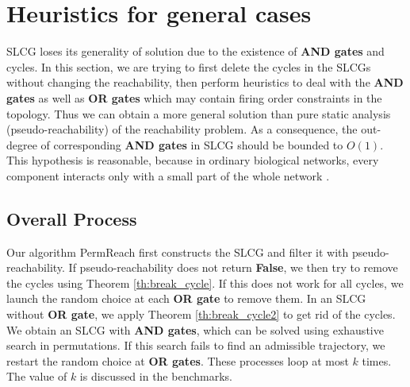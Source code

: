 \documentclass[runningheads]{llncs}
\begin{document}
\section{Heuristics for general cases}\label{sect:4}
SLCG loses its generality of solution due to the existence of \textbf{AND gates} and cycles.
In this section, we are trying to first delete the cycles in the SLCGs without changing the reachability, then perform heuristics to deal with the \textbf{AND gates} as well as \textbf{OR gates} which may contain firing order constraints in the topology.
Thus we can obtain a more general solution than pure static analysis (pseudo-reachability) of the reachability problem.
As a consequence, the out-degree of corresponding \textbf{AND gates} in SLCG should be bounded to $O(1)$.
This hypothesis is reasonable, because in ordinary biological networks, every component interacts only with a small part of the whole network \cite{akutsu2007control}.

\subsection{Overall Process}\label{sectOverall}
Our algorithm PermReach first constructs the SLCG and filter it with pseudo-reachability. 
If pseudo-reachability does not return \textbf{False}, we then try to remove the cycles using Theorem \ref{th:break_cycle}.
If this does not work for all cycles, we launch the random choice at each \textbf{OR gate} to remove them.
In an SLCG without \textbf{OR gate}, we apply Theorem \ref{th:break_cycle2} to get rid of the cycles.
We obtain an SLCG with \textbf{AND gates}, which can be solved using exhaustive search in permutations.
If this search fails to find an admissible trajectory, we restart the random choice at \textbf{OR gates}.
These processes loop at most $k$ times.
The value of $k$ is discussed in the benchmarks.
\end{document}

